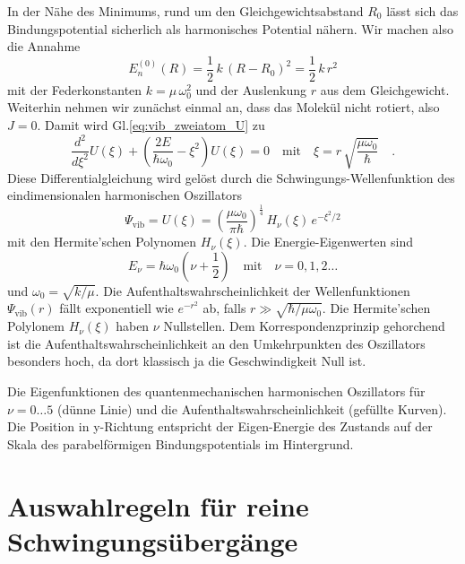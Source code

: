 In der Nähe des Minimums, rund um den Gleichgewichtsabstand $R_0$ lässt sich das Bindungspotential sicherlich als harmonisches Potential nähern. Wir machen also die Annahme
\begin{equation}
E_n^{(0)}(R)  = \frac{1}{2} \, k \, (R - R_0 )^2 = \frac{1}{2} \, k \, r^2 
\end{equation}
mit der Federkonstanten $k = \mu \, \omega_0^2$ und der Auslenkung $r$ aus dem Gleichgewicht. Weiterhin nehmen wir zunächst einmal an, dass das Molekül nicht rotiert, also $J=0$.  Damit wird Gl.\ref{eq:vib_zweiatom_U} zu
\begin{equation}
 \frac{d^2}{d \xi^2} U(\xi) + \left( \frac{2 E }{\hbar \omega_0}  - \xi^2  \right) U(\xi) = 0 \quad \text{mit} \quad \xi =  r \, \sqrt{\frac{\mu \omega_0}{\hbar}  } \quad .
\end{equation}
Diese Differentialgleichung wird gelöst durch die Schwingungs-Wellenfunktion des eindimensionalen harmonischen Oszillators
\begin{equation}
\Psi_\text{vib} =  U(\xi) = \left(\frac{\mu \omega_0}{\pi \hbar} \right)^{\frac{1}{4}} \,
 H_\nu(\xi) \, e^{- \xi^2 /2}
\end{equation}
mit den Hermite'schen Polynomen $H_\nu(\xi)$.
Die Energie-Eigenwerten sind
\begin{equation}
E_\nu = \hbar \omega_0 \left(\nu + \frac{1}{2} \right) \quad \text{mit} \quad \nu = 0, 1, 2 \dots
\end{equation}
und $\omega_0 = \sqrt{k / \mu}$. Die Aufenthaltswahrscheinlichkeit der Wellenfunktionen $\Psi_\text{vib}(r)$ fällt exponentiell wie $e^{-r^2}$ ab, falls $r \gg \sqrt{\hbar / \mu \omega_0}$. Die Hermite'schen Polylonem $H_\nu(\xi)$ haben $\nu$ Nullstellen. Dem Korrespondenzprinzip gehorchend ist die 
Aufenthaltswahrscheinlichkeit an den Umkehrpunkten des Oszillators besonders hoch, da dort klassisch ja die Geschwindigkeit Null ist.


\begin{marginfigure}
\caption{Die Eigenfunktionen des quantenmechanischen harmonischen Oszillators für $\nu = 0 \dots 5$ (dünne Linie) und die Aufenthaltswahrscheinlichkeit (gefüllte Kurven). Die Position in y-Richtung entspricht der Eigen-Energie des Zustands auf der Skala des parabelförmigen Bindungspotentials im Hintergrund.
\label{fig:vib_1d_WF}}
\end{marginfigure}


\section{Auswahlregeln für reine Schwingungsübergänge}

